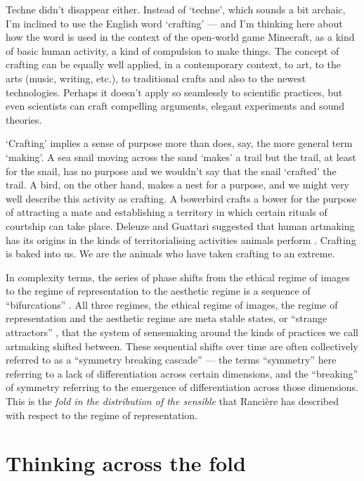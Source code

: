 \documentclass[letterpaper]{article}
\begin{document}
    Techne didn't disappear either. Instead of ‘techne’, which sounds a bit archaic, I'm inclined to use the English word ‘crafting’ — and I'm thinking here about how the word is used in the context of the open-world game Minecraft, as a kind of basic human activity, a kind of compulsion to make things. The concept of crafting can be equally well applied, in a contemporary context, to art, to the arts (music, writing, etc.), to traditional crafts and also to the newest technologies. Perhaps it doesn't apply so seamlessly to scientific practices, but even scientists can craft compelling arguments, elegant experiments and sound theories.

    ‘Crafting’ implies a sense of purpose more than does, say, the more general term ‘making’. A sea snail moving across the sand ‘makes’ a trail but the trail, at least for the snail, has no purpose and we wouldn't say that the snail ‘crafted’ the trail. A bird, on the other hand, makes a nest for a purpose, and we might very well describe this activity as crafting. A bowerbird crafts a bower for the purpose of attracting a mate and establishing a territory in which certain rituals of courtship can take place. Deleuze and Guattari suggested that human artmaking has its origins in the kinds of territorialising activities animals perform \citep[p.15]{GuattariChsmss1995}. Crafting is baked into us. We are the animals who have taken crafting to an extreme.
    
    In complexity terms, the series of phase shifts from the ethical regime of images to the regime of representation to the aesthetic regime is a sequence of “bifurcations” \citep{LandauThryOfPhstrnstns1936}. All three regimes, the ethical regime of images, the regime of representation and the aesthetic regime are meta stable states, or “strange attractors” \citep{RuelleTakensOnThNtrOfTrblnc1971}, that the system of sensemaking around the kinds of practices we call artmaking shifted between. These sequential shifts over time are often collectively referred to as a “symmetry breaking cascade” — the terms “symmetry” here referring to a lack of differentiation across certain dimensions, and the “breaking” of symmetry referring to the emergence of differentiation across those dimensions. This is the \emph{fold in the distribution of the sensible} that Rancière has described with respect to the regime of representation.

\section{Thinking across the fold}
\end{document}
